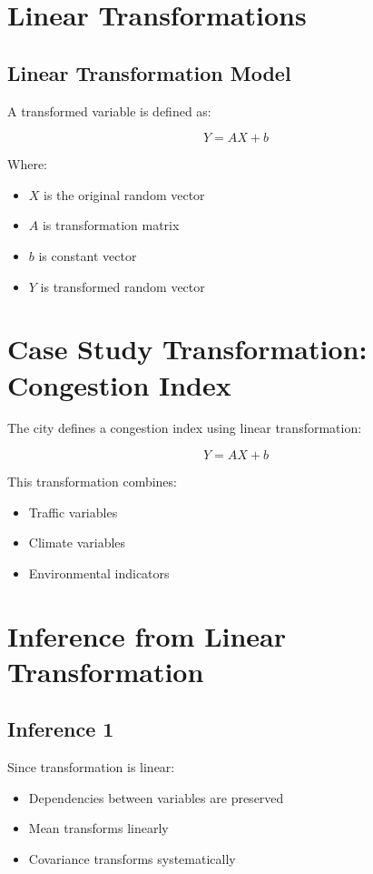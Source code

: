 \documentclass[11pt]{article}
\begin{document}
\section{Linear Transformations}

\subsection{Linear Transformation Model}

A transformed variable is defined as:

\[
Y = AX + b
\]

Where:

\begin{itemize}
\item $X$ is the original random vector
\item $A$ is transformation matrix
\item $b$ is constant vector
\item $Y$ is transformed random vector
\end{itemize}

\section{Case Study Transformation: Congestion Index}

The city defines a congestion index using linear transformation:

\[
Y = AX + b
\]

This transformation combines:

\begin{itemize}
\item Traffic variables
\item Climate variables
\item Environmental indicators
\end{itemize}

\section{Inference from Linear Transformation}

\subsection{Inference 1}

Since transformation is linear:

\begin{itemize}
\item Dependencies between variables are preserved
\item Mean transforms linearly
\item Covariance transforms systematically
\end{itemize}
\end{document}

